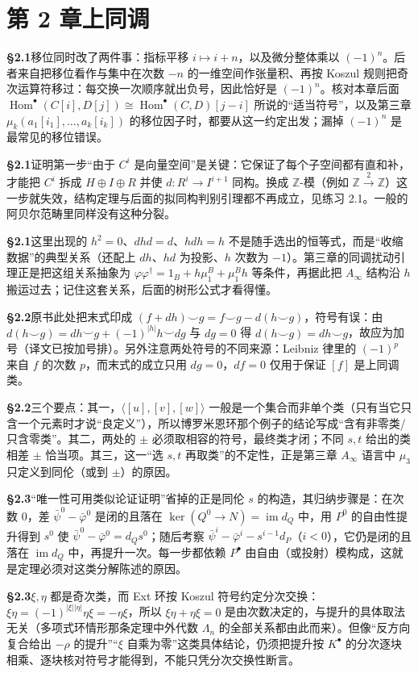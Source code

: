 \section*{第 2 章\quad 上同调}
\noindent\textbf{§2.1}\quad 移位同时改了两件事：指标平移 $i\mapsto i+n$，以及微分整体乘以 $(-1)^n$。后者来自把移位看作与集中在次数 $-n$ 的一维空间作张量积、再按 Koszul 规则把奇次运算符移过：每交换一次顺序就出负号，因此恰好是 $(-1)^n$。核对本章后面 $\operatorname{Hom}^\bullet(C[i],D[j])\cong\operatorname{Hom}^\bullet(C,D)[j-i]$ 所说的“适当符号”，以及第三章 $\mu_k(a_1[i_1],\ldots,a_k[i_k])$ 的移位因子时，都要从这一约定出发；漏掉 $(-1)^n$ 是最常见的移位错误。\par\medskip
\noindent\textbf{§2.1}\quad 证明第一步“由于 $C^i$ 是向量空间”是关键：它保证了每个子空间都有直和补，才能把 $C^i$ 拆成 $H\oplus I\oplus R$ 并使 $d\colon R^i\to I^{i+1}$ 同构。换成 $\mathbb Z$-模（例如 $\mathbb Z\xrightarrow{2}\mathbb Z$）这一步就失效，结构定理与后面的拟同构判别引理都不再成立，见练习 2.1。一般的阿贝尔范畴里同样没有这种分裂。\par\medskip
\noindent\textbf{§2.1}\quad 这里出现的 $h^2=0$、$dhd=d$、$hdh=h$ 不是随手选出的恒等式，而是“收缩数据”的典型关系（还配上 $dh$、$hd$ 为投影、$h$ 次数为 $-1$）。第三章的同调扰动引理正是把这组关系抽象为 $\varphi\varphi^\dagger=1_B+h\mu_1^B+\mu_1^Bh$ 等条件，再据此把 $A_\infty$ 结构沿 $h$ 搬运过去；记住这套关系，后面的树形公式才看得懂。\par\medskip
\noindent\textbf{§2.2}\quad 原书此处把末式印成 $(f+dh)\smile g=f\smile g-d(h\smile g)$，符号有误：由 $d(h\smile g)=dh\smile g+(-1)^{|h|}h\smile dg$ 与 $dg=0$ 得 $d(h\smile g)=dh\smile g$，故应为加号（译文已按加号排）。另外注意两处符号的不同来源：Leibniz 律里的 $(-1)^p$ 来自 $f$ 的次数 $p$，而末式的成立只用 $dg=0$，$df=0$ 仅用于保证 $[f]$ 是上同调类。\par\medskip
\noindent\textbf{§2.2}\quad 三个要点：其一，$\langle[u],[v],[w]\rangle$ 一般是一个集合而非单个类（只有当它只含一个元素时才说“良定义”），所以博罗米恩环那个例子的结论写成“含有非零类/只含零类”。其二，两处的 $\pm$ 必须取相容的符号，最终类才闭；不同 $s,t$ 给出的类相差 $\pm$ 恰当项。其三，这一“选 $s,t$ 再取类”的不定性，正是第三章 $A_\infty$ 语言中 $\mu_3$ 只定义到同伦（或到 $\pm$）的原因。\par\medskip
\noindent\textbf{§2.3}\quad “唯一性可用类似论证证明”省掉的正是同伦 $s$ 的构造，其归纳步骤是：在次数 $0$，差 $\bar\psi^0-\bar\varphi^0$ 是闭的且落在 $\ker(Q^0\to N)=\operatorname{im}d_Q$ 中，用 $P^0$ 的自由性提升得到 $s^0$ 使 $\bar\psi^0-\bar\varphi^0=d_Qs^0$；随后考察 $\bar\psi^{i}-\bar\varphi^{i}-s^{i-1}d_P$（$i<0$），它仍是闭的且落在 $\operatorname{im}d_Q$ 中，再提升一次。每一步都依赖 $P^\bullet$ 由自由（或投射）模构成，这就是定理必须对这类分解陈述的原因。\par\medskip
\noindent\textbf{§2.3}\quad $\xi,\eta$ 都是奇次类，而 Ext 环按 Koszul 符号约定分次交换：$\xi\eta=(-1)^{|\xi||\eta|}\eta\xi=-\eta\xi$，所以 $\xi\eta+\eta\xi=0$ 是由次数决定的，与提升的具体取法无关（多项式环情形那条定理中外代数 $\Lambda_n$ 的全部关系都由此而来）。但像“反方向复合给出 $-\rho$ 的提升”“$\xi$ 自乘为零”这类具体结论，仍须把提升按 $K^\bullet$ 的分次逐块相乘、逐块核对符号才能得到，不能只凭分次交换性断言。\par\medskip
